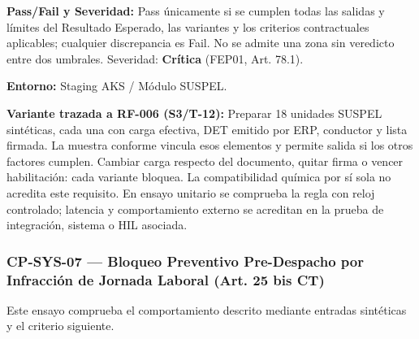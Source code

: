 \par\noindent\textbf{Pass/Fail y Severidad:} Pass únicamente si se cumplen todas las salidas y límites del Resultado Esperado, las variantes y los criterios contractuales aplicables; cualquier discrepancia es Fail. No se admite una zona sin veredicto entre dos umbrales. Severidad: \textbf{Crítica} (FEP01, Art. 78.1).\par
\par\noindent\textbf{Entorno:} Staging AKS / Módulo SUSPEL.\par







\par\noindent\textbf{Variante trazada a RF-006 (S3/T-12):} Preparar 18 unidades SUSPEL sintéticas, cada una con carga efectiva, DET emitido por ERP, conductor y lista firmada. La muestra conforme vincula esos elementos y permite salida si los otros factores cumplen. Cambiar carga respecto del documento, quitar firma o vencer habilitación: cada variante bloquea. La compatibilidad química por sí sola no acredita este requisito. En ensayo unitario se comprueba la regla con reloj controlado; latencia y comportamiento externo se acreditan en la prueba de integración, sistema o HIL asociada.\par
\subsubsection*{CP-SYS-07 — Bloqueo Preventivo Pre-Despacho por Infracción de Jornada Laboral (Art. 25 bis CT)}\label{sec:9-cp-sys-07}
Este ensayo comprueba el comportamiento descrito mediante entradas sintéticas y el criterio siguiente.

